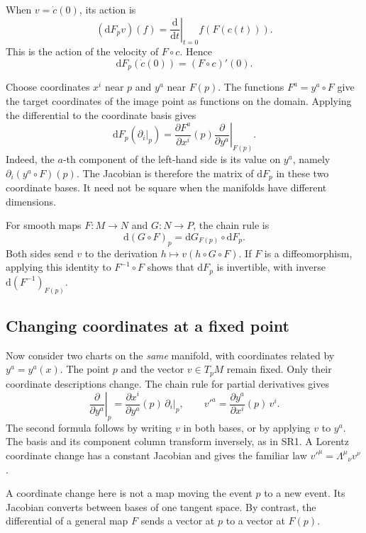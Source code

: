 \documentclass[11pt,a4paper]{article}
\numberwithin{equation}{section}
\newcommand{\dd}{\mathrm d}
\begin{document}
When \(v=\dot c(0)\), its action is
\[
 (\dd F_pv)(f)
 =\left.\frac{\dd}{\dd t}\right|_{t=0}f(F(c(t))).
\]
This is the action of the velocity of \(F\circ c\). Hence
\[
 \dd F_p(\dot c(0))=(F\circ c)'(0).
\]

Choose coordinates \(x^i\) near \(p\) and \(y^a\) near \(F(p)\).
The functions \(F^a=y^a\circ F\) give the target coordinates of the
image point as functions on the domain. Applying the differential to
the coordinate basis gives
\begin{equation}
 \dd F_p(\partial_i|_p)
 =\frac{\partial F^a}{\partial x^i}(p)
   \left.\frac{\partial}{\partial y^a}\right|_{F(p)}.
 \label{eq:jacobian-differential}
\end{equation}
Indeed, the \(a\)-th component of the left-hand side is its value on
\(y^a\), namely \(\partial_i(y^a\circ F)(p)\). The Jacobian is therefore
the matrix of \(\dd F_p\) in these two coordinate bases. It need not be
square when the manifolds have different dimensions.

For smooth maps \(F:M\to N\) and \(G:N\to P\), the chain rule is
\[
 \dd(G\circ F)_p=\dd G_{F(p)}\circ\dd F_p.
\]
Both sides send \(v\) to the derivation
\(h\mapsto v(h\circ G\circ F)\). If \(F\) is a diffeomorphism, applying
this identity to \(F^{-1}\circ F\) shows that \(\dd F_p\) is invertible,
with inverse \(\dd(F^{-1})_{F(p)}\).

\subsection{Changing coordinates at a fixed point}

Now consider two charts on the \emph{same} manifold, with coordinates
related by \(y^a=y^a(x)\). The point \(p\) and the vector \(v\in T_pM\)
remain fixed. Only their coordinate descriptions change. The chain rule
for partial derivatives gives
\begin{equation}
 \left.\frac{\partial}{\partial y^a}\right|_p
 =\frac{\partial x^i}{\partial y^a}(p)\,\partial_i|_p,
 \qquad
 v'^a=\frac{\partial y^a}{\partial x^i}(p)\,v^i.
 \label{eq:vector-coordinate-change}
\end{equation}
The second formula follows by writing \(v\) in both bases, or by applying
\(v\) to \(y^a\). The basis and its component column transform inversely,
as in SR1. A Lorentz coordinate change has a constant Jacobian and gives
the familiar law \(v'^\mu=\Lambda^\mu{}_\nu v^\nu\).

A coordinate change here is not a map moving the event \(p\) to a new
event. Its Jacobian converts between bases of one tangent space. By
contrast, the differential of a general map \(F\) sends a vector at
\(p\) to a vector at \(F(p)\).
\end{document}
